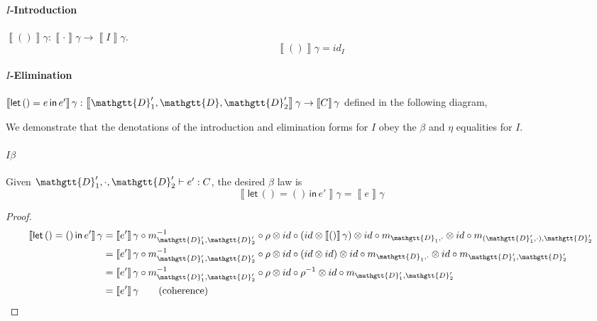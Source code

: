 \documentclass[acmsmall,nonacm]{acmart}
\renewcommand{\Delta}{\mathgtt{D}}
\newcommand{\sem}[1]{\left\llbracket{#1}\right\rrbracket}
\newcommand{\semg}[1]{\sem{#1}\gamma}
\newcommand{\letin}[3]{\mathsf{let}\, #1 = #2 \, \mathsf{in}\, #3}
\begin{document}
{\paragraph{$I$-Introduction}
$\semg{()} : \semg{\cdot} \to \semg{I}$.
\[
\semg{()} = id_{I}
\]

\paragraph{$I$-Elimination}
$\semg{\letin {()} e e'} : \semg{\Delta'_{1},\Delta,\Delta'_{2}} \to \semg{C}$
defined in the following diagram,

\begin{center}
\end{center}

We demonstrate that the denotations of the introduction and elimination forms
for $I$ obey the $\beta$ and $\eta$ equalities for $I$.

\paragraph{$I\beta$}
Given
$\Delta'_{1},\cdot,\Delta'_{2} \vdash e' : C$, the desired
$\beta$ law is
\[
  \semg{\letin {()} {()} {e'}} = \semg{e}
\]
\begin{proof}
\begin{align*}
  \semg{\letin {()} {()} {e'}}
  & = \semg{e'} \circ m^{-1}_{\Delta'_{1},\Delta'_{2}} \circ \rho \otimes id \circ (id \otimes \semg{()}) \otimes id \circ m_{\Delta_{1},\cdot} \otimes id \circ m_{(\Delta'_{1},\cdot),\Delta'_{2}} \\
  & = \semg{e'} \circ m^{-1}_{\Delta'_{1},\Delta'_{2}} \circ \rho \otimes id \circ (id \otimes id) \otimes id \circ m_{\Delta_{1},\cdot} \otimes id \circ m_{\Delta'_{1},\Delta'_{2}} \\
  & = \semg{e'} \circ m^{-1}_{\Delta'_{1},\Delta'_{2}} \circ \rho \otimes id \circ \rho^{-1} \otimes id \circ m_{\Delta'_{1},\Delta'_{2}} \\
  & = \semg{e'} \tag{coherence}
\end{align*}
\end{proof}

}
\end{document}
